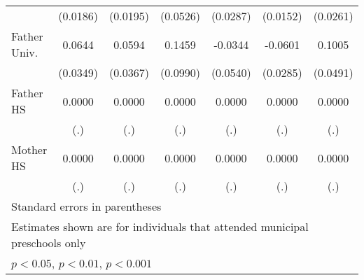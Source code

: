 \begin{table}[htbp]
\begin{tabular}{l*{6}{c}}
            &    (0.0186)         &    (0.0195)         &    (0.0526)         &    (0.0287)         &    (0.0152)         &    (0.0261)         \\
\addlinespace
Father Univ.&      0.0644         &      0.0594         &      0.1459         &     -0.0344         &     -0.0601\sym{*}  &      0.1005\sym{*}  \\
            &    (0.0349)         &    (0.0367)         &    (0.0990)         &    (0.0540)         &    (0.0285)         &    (0.0491)         \\
\addlinespace
Father HS   &      0.0000         &      0.0000         &      0.0000         &      0.0000         &      0.0000         &      0.0000         \\
            &         (.)         &         (.)         &         (.)         &         (.)         &         (.)         &         (.)         \\
\addlinespace
Mother HS   &      0.0000         &      0.0000         &      0.0000         &      0.0000         &      0.0000         &      0.0000         \\
            &         (.)         &         (.)         &         (.)         &         (.)         &         (.)         &         (.)         \\
\bottomrule
\multicolumn{7}{l}{\footnotesize Standard errors in parentheses}\\
\multicolumn{7}{l}{\footnotesize Estimates shown are for individuals that attended municipal preschools only}\\
\multicolumn{7}{l}{\footnotesize \sym{*} \(p<0.05\), \sym{**} \(p<0.01\), \sym{***} \(p<0.001\)}\\
\end{tabular}
\end{table}
